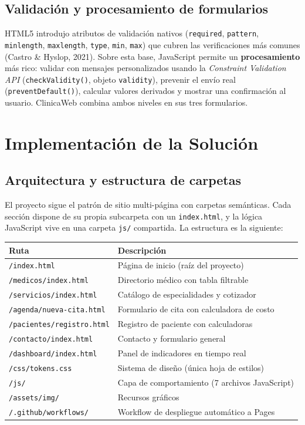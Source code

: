 \documentclass[11pt,a4paper]{article}
\newcommand{\thead}[1]{\textbf{\color{white}#1}}
\newcommand{\hrow}{\rowcolor{navy}}
\begin{document}
\subsection{Validación y procesamiento de formularios}
HTML5 introdujo atributos de validación nativos (\lstinline|required|, \lstinline|pattern|, \lstinline|minlength|, \lstinline|maxlength|, \lstinline|type|, \lstinline|min|, \lstinline|max|) que cubren las verificaciones más comunes (Castro \& Hyslop, 2021). Sobre esta base, JavaScript permite un \textbf{procesamiento} más rico: validar con mensajes personalizados usando la \emph{Constraint Validation API} (\lstinline|checkValidity()|, objeto \lstinline|validity|), prevenir el envío real (\lstinline|preventDefault()|), calcular valores derivados y mostrar una confirmación al usuario. ClinicaWeb combina ambos niveles en sus tres formularios.

\section{Implementación de la Solución}

\subsection{Arquitectura y estructura de carpetas}
El proyecto sigue el patrón de sitio multi-página con carpetas semánticas. Cada sección dispone de su propia subcarpeta con un \texttt{index.html}, y la lógica JavaScript vive en una carpeta \texttt{js/} compartida. La estructura es la siguiente:

\begin{center}
\begin{tabularx}{\textwidth}{l Y}
\hrow \thead{Ruta} & \thead{Descripción} \\
\midrule
\texttt{/index.html} & Página de inicio (raíz del proyecto) \\
\texttt{/medicos/index.html} & Directorio médico con tabla filtrable \\
\texttt{/servicios/index.html} & Catálogo de especialidades y cotizador \\
\texttt{/agenda/nueva-cita.html} & Formulario de cita con calculadora de costo \\
\texttt{/pacientes/registro.html} & Registro de paciente con calculadoras \\
\texttt{/contacto/index.html} & Contacto y formulario general \\
\texttt{/dashboard/index.html} & Panel de indicadores en tiempo real \\
\texttt{/css/tokens.css} & Sistema de diseño (única hoja de estilos) \\
\texttt{/js/} & Capa de comportamiento (7 archivos JavaScript) \\
\texttt{/assets/img/} & Recursos gráficos \\
\texttt{/.github/workflows/} & Workflow de despliegue automático a Pages \\
\bottomrule
\end{tabularx}
\end{center}
\end{document}
